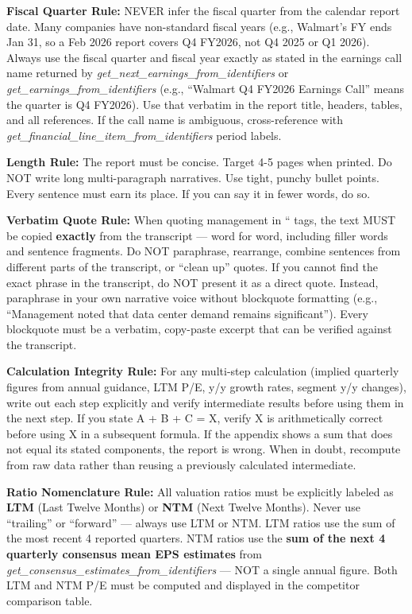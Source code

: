 \documentclass[11pt]{article}
\begin{document}
\textbf{Fiscal Quarter Rule:} NEVER infer the fiscal quarter from the calendar report date. Many companies have non-standard fiscal years (e.g., Walmart's FY ends Jan 31, so a Feb 2026 report covers Q4 FY2026, not Q4 2025 or Q1 2026). Always use the fiscal quarter and fiscal year exactly as stated in the earnings call name returned by \emph{get\_\allowbreak{}next\_\allowbreak{}earnings\_\allowbreak{}from\_\allowbreak{}identifiers} or \emph{get\_\allowbreak{}earnings\_\allowbreak{}from\_\allowbreak{}identifiers} (e.g., ``Walmart Q4 FY2026 Earnings Call'' means the quarter is Q4 FY2026). Use that verbatim in the report title, headers, tables, and all references. If the call name is ambiguous, cross-reference with \emph{get\_\allowbreak{}financial\_\allowbreak{}line\_\allowbreak{}item\_\allowbreak{}from\_\allowbreak{}identifiers} period labels.


\textbf{Length Rule:} The report must be concise. Target 4-5 pages when printed. Do NOT write long multi-paragraph narratives. Use tight, punchy bullet points. Every sentence must earn its place. If you can say it in fewer words, do so.


\textbf{Verbatim Quote Rule:} When quoting management in `` tags, the text MUST be copied \textbf{exactly} from the transcript — word for word, including filler words and sentence fragments. Do NOT paraphrase, rearrange, combine sentences from different parts of the transcript, or ``clean up'' quotes. If you cannot find the exact phrase in the transcript, do NOT present it as a direct quote. Instead, paraphrase in your own narrative voice without blockquote formatting (e.g., ``Management noted that data center demand remains significant''). Every blockquote must be a verbatim, copy-paste excerpt that can be verified against the transcript.


\textbf{Calculation Integrity Rule:} For any multi-step calculation (implied quarterly figures from annual guidance, LTM P/E, y/y growth rates, segment y/y changes), write out each step explicitly and verify intermediate results before using them in the next step. If you state A + B + C = X, verify X is arithmetically correct before using X in a subsequent formula. If the appendix shows a sum that does not equal its stated components, the report is wrong. When in doubt, recompute from raw data rather than reusing a previously calculated intermediate.


\textbf{Ratio Nomenclature Rule:} All valuation ratios must be explicitly labeled as \textbf{LTM} (Last Twelve Months) or \textbf{NTM} (Next Twelve Months). Never use ``trailing'' or ``forward'' — always use LTM or NTM. LTM ratios use the sum of the most recent 4 reported quarters. NTM ratios use the \textbf{sum of the next 4 quarterly consensus mean EPS estimates} from \emph{get\_\allowbreak{}consensus\_\allowbreak{}estimates\_\allowbreak{}from\_\allowbreak{}identifiers} — NOT a single annual figure. Both LTM and NTM P/E must be computed and displayed in the competitor comparison table.
\end{document}
